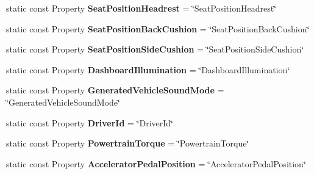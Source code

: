 \begin{DoxyCompactItemize}
\item 
\hypertarget{classVehicleProperty_ad8b62a1dea61b1d37203010ebb95f8cb}{static const Property {\bfseries Seat\+Position\+Headrest} = \char`\"{}Seat\+Position\+Headrest\char`\"{}}\label{classVehicleProperty_ad8b62a1dea61b1d37203010ebb95f8cb}

\item 
\hypertarget{classVehicleProperty_a355f4eaaa3189f081d5ab5bfaada5a0a}{static const Property {\bfseries Seat\+Position\+Back\+Cushion} = \char`\"{}Seat\+Position\+Back\+Cushion\char`\"{}}\label{classVehicleProperty_a355f4eaaa3189f081d5ab5bfaada5a0a}

\item 
\hypertarget{classVehicleProperty_ad6f1eef532c05b0fa36092d934601ed5}{static const Property {\bfseries Seat\+Position\+Side\+Cushion} = \char`\"{}Seat\+Position\+Side\+Cushion\char`\"{}}\label{classVehicleProperty_ad6f1eef532c05b0fa36092d934601ed5}

\item 
\hypertarget{classVehicleProperty_a7d923b6b7a8f3a27e75aa6e8a0aa1057}{static const Property {\bfseries Dashboard\+Illumination} = \char`\"{}Dashboard\+Illumination\char`\"{}}\label{classVehicleProperty_a7d923b6b7a8f3a27e75aa6e8a0aa1057}

\item 
\hypertarget{classVehicleProperty_a213eda302bd74172fda1e408d72079f6}{static const Property {\bfseries Generated\+Vehicle\+Sound\+Mode} = \char`\"{}Generated\+Vehicle\+Sound\+Mode\char`\"{}}\label{classVehicleProperty_a213eda302bd74172fda1e408d72079f6}

\item 
\hypertarget{classVehicleProperty_a5396b973e6511c2cd31b1a7b9f83d69c}{static const Property {\bfseries Driver\+Id} = \char`\"{}Driver\+Id\char`\"{}}\label{classVehicleProperty_a5396b973e6511c2cd31b1a7b9f83d69c}

\item 
\hypertarget{classVehicleProperty_a6c090cc68b21c9ed0e6d6d5f657bdff5}{static const Property {\bfseries Powertrain\+Torque} = \char`\"{}Powertrain\+Torque\char`\"{}}\label{classVehicleProperty_a6c090cc68b21c9ed0e6d6d5f657bdff5}

\item 
\hypertarget{classVehicleProperty_a34e5431f9cb166c5c32735e8f161f7f1}{static const Property {\bfseries Accelerator\+Pedal\+Position} = \char`\"{}Accelerator\+Pedal\+Position\char`\"{}}\label{classVehicleProperty_a34e5431f9cb166c5c32735e8f161f7f1}


\end{DoxyCompactItemize}
